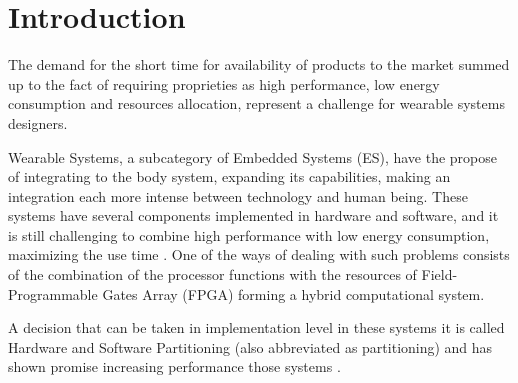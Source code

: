 \section{Introduction} \label{chap:introducao}

    
    The demand for the short time for availability of products to the market summed up to the fact of requiring proprieties as high performance, low energy consumption and resources allocation, represent a challenge for wearable systems designers.
    
    Wearable Systems, a subcategory of Embedded Systems (ES), have the propose of integrating to the body system, expanding its capabilities, making an integration each more intense between technology and human being.
    These systems have several components implemented in hardware and software, and it is still challenging to combine high performance with low energy consumption, maximizing the use time \cite{Wolf1994, Edwards1994}.
    One of the ways of dealing with such problems consists of the combination of the processor functions with the resources of Field-Programmable Gates Array (FPGA) forming a hybrid computational system.
    
    
    A decision that can be taken in implementation level in these systems it is called Hardware and Software Partitioning (also abbreviated as partitioning) and has shown promise increasing performance those systems \cite{Sass2010, BenHajHassine2017}.
    
